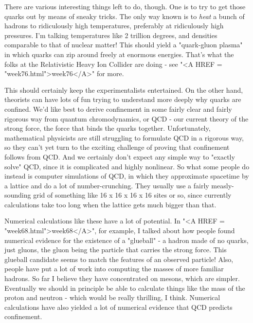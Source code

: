 There are various interesting things left to do, though.  One is to
try to get those quarks out by means of sneaky tricks.  The only way
known is to \emph{heat} a bunch of hadrons to ridiculously high temperatures,
preferably at ridiculously high pressures.  I'm talking temperatures
like 2 trillion degrees, and densities comparable to that of nuclear
matter!  This should yield a "quark-gluon plasma" in which quarks can
zip around freely at enormous energies.  That's what the folks at the
Relativistic Heavy Ion Collider are doing - see "<A HREF = "week76.html">week76</A>" for more.

This should certainly keep the experimentalists entertained.  On the
other hand, theorists can have lots of fun trying to understand more
deeply why quarks are confined.  We'd like best to derive confinement in
some fairly clear and fairly rigorous way from quantum chromodynamics,
or QCD - our current theory of the strong force, the force that binds
the quarks together.  Unfortunately, mathematical physicists are still
struggling to formulate QCD in a rigorous way, so they can't yet turn to
the exciting challenge of proving that confinement follows from QCD.
And we certainly don't expect any simple way to "exactly solve" QCD,
since it is complicated and highly nonlinear.  So what some people do
instead is computer simulations of QCD, in which they approximate
spacetime by a lattice and do a lot of number-crunching.  They usually
use a fairly measly-sounding grid of something like 16 x 16 x 16 x 16
sites or so, since currently calculations take too long when the lattice
gets much bigger than that.

Numerical calculations like these have a lot of potential.  In "<A HREF = "week68.html">week68</A>",
for example, I talked about how people found numerical evidence for the
existence of a "glueball" - a hadron made of no quarks, just gluons,
the gluon being the particle that carries the strong force.  This
glueball candidate seems to match the features of an observed particle!
Also, people have put a lot of work into computing the masses of more
familiar hadrons.  So far I believe they have concentrated on mesons,
which are simpler.  Eventually we should in principle be able to
calculate things like the mass of the proton and neutron - which would
be really thrilling, I think.  Numerical calculations have also
yielded a lot of numerical evidence that QCD predicts confinement.  

